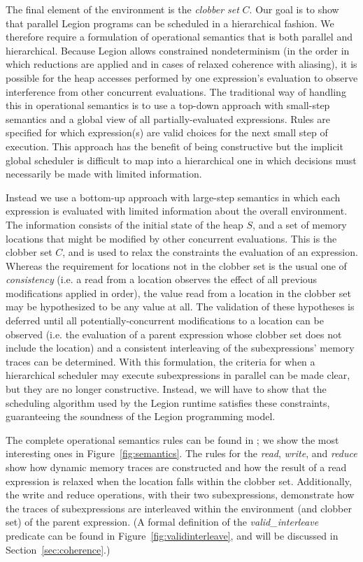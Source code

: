 The final element of the environment is the {\em clobber set} $C$.  Our goal is to show that parallel Legion
programs can
be scheduled in a hierarchical fashion.  We therefore require a formulation of operational semantics
that is both parallel and hierarchical.  Because Legion allows constrained nondeterminism (in the order in which
reductions are applied and in cases of relaxed coherence with aliasing), it is possible for the heap accesses performed by
one expression's evaluation to observe interference from other concurrent evaluations.  The traditional way of
handling this in operational semantics \cite{XYZ} is to use a top-down approach with small-step semantics and
a global view of all
partially-evaluated expressions.  Rules are specified for which expression(s) are valid choices for the next small
step of execution.  This approach has the benefit of being constructive but the implicit global scheduler is
difficult to map into a hierarchical one in which decisions must necessarily be made with limited information.

Instead we use a bottom-up approach with large-step semantics in which each expression is evaluated with limited 
information about the overall environment.  The information consists of the initial state of the heap $S$, and a
set of memory locations that might be modified by other concurrent evaluations.  This is the clobber set $C$,
and is used to relax the constraints the evaluation of an expression.  Whereas the requirement for locations not
in the clobber set is the usual one of {\em consistency} (i.e. a read from a location observes the effect of all 
previous modifications applied in order), the value read from a location in the clobber set may be hypothesized
to be any value at all.  The validation of these hypotheses is deferred until all potentially-concurrent
modifications to a location can be observed (i.e. the evaluation of a parent expression whose clobber set does
not include the location) and a consistent interleaving of the subexpressions' memory traces can be determined.
With this formulation, the criteria for when a hierarchical scheduler may execute subexpressions in parallel can be
made clear, but they are no longer constructive.  Instead, we will have to show that the scheduling algorithm
used by the Legion runtime satisfies these constraints, guaranteeing the soundness of the Legion programming model.

The complete operational semantics rules can be found in \cite{LegionTypes12}; we show the most interesting ones
in Figure~\ref{fig:semantics}.  The rules for the {\em read}, {\em write}, and {\em reduce} show how dynamic memory
traces are constructed and how the result of a read expression is relaxed when the location falls within the
clobber set.  Additionally, the write and reduce operations, with their two subexpressions, demonstrate how the
traces of subexpressions are interleaved within the environment (and clobber set) of the parent expression.
(A formal definition of the {\em valid\_interleave} predicate can be found in Figure~\ref{fig:validinterleave}, and
will be discussed in Section~\ref{sec:coherence}.)

